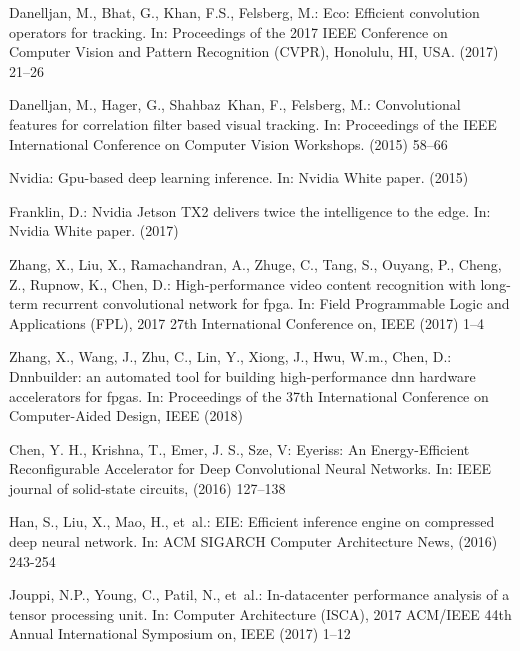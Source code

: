 \documentclass[runningheads]{llncs}
\begin{document}

\begin{thebibliography}{10}

Danelljan, M., Bhat, G., Khan, F.S., Felsberg, M.:
\newblock Eco: Efficient convolution operators for tracking.
\newblock In: Proceedings of the 2017 IEEE Conference on Computer Vision and
  Pattern Recognition (CVPR), Honolulu, HI, USA. (2017)  21--26

Danelljan, M., Hager, G., Shahbaz~Khan, F., Felsberg, M.:
\newblock Convolutional features for correlation filter based visual tracking.
\newblock In: Proceedings of the IEEE International Conference on Computer
  Vision Workshops. (2015)  58--66

Nvidia:
\newblock Gpu-based deep learning inference.
\newblock In: Nvidia White paper. (2015)

Franklin, D.:
\newblock Nvidia {Jetson} {TX2} delivers twice the intelligence to the edge.
\newblock In: Nvidia White paper. (2017)

Zhang, X., Liu, X., Ramachandran, A., Zhuge, C., Tang, S., Ouyang, P., Cheng,
  Z., Rupnow, K., Chen, D.:
\newblock High-performance video content recognition with long-term recurrent
  convolutional network for fpga.
\newblock In: Field Programmable Logic and Applications (FPL), 2017 27th
  International Conference on, IEEE (2017)  1--4

Zhang, X., Wang, J., Zhu, C., Lin, Y., Xiong, J., Hwu, W.m., Chen, D.:
\newblock Dnnbuilder: an automated tool for building high-performance dnn
  hardware accelerators for fpgas.
\newblock In: Proceedings of the 37th International Conference on
  Computer-Aided Design, IEEE (2018)

Chen, Y. H., Krishna, T., Emer, J. S., Sze, V:
\newblock Eyeriss: An Energy-Efficient Reconfigurable Accelerator for Deep Convolutional Neural Networks.
\newblock In: IEEE journal of solid-state circuits, (2016) 127--138

Han, S., Liu, X., Mao, H., et~al.:
\newblock EIE: Efficient inference engine on compressed deep neural network.
\newblock In: ACM SIGARCH Computer Architecture News, (2016) 243-254

Jouppi, N.P., Young, C., Patil, N.,  et~al.:
\newblock In-datacenter performance analysis of a tensor processing unit.
\newblock In: Computer Architecture (ISCA), 2017 ACM/IEEE 44th Annual
  International Symposium on, IEEE (2017)  1--12


\end{thebibliography}
\end{document}
